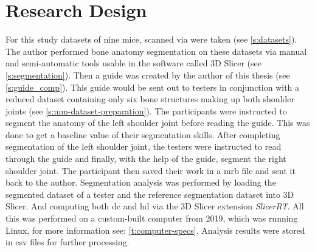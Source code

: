 \section{Research Design}\label{s:researchDesign}
For this study datasets of nine mice, scanned via \mct\space were taken (see \cref{s:datasets}).
The author performed bone anatomy segmentation on these datasets via manual and semi-automatic tools usable in the software called 3D Slicer (see \cref{s:segmentation}).
Then a guide was created by the author of this thesis (see \cref{s:guide_comp}).
This guide would be sent out to testers in conjunction with a reduced dataset containing only six bone structures making up both shoulder joints (see \cref{s:mm-dataset-preparation}).
The participants were instructed to segment the anatomy of the left shoulder joint before reading the guide.
This was done to get a baseline value of their segmentation skills.
After completing segmentation of the left shoulder joint, the testers were instructed to read through the guide and finally,
with the help of the guide, segment the right shoulder joint.
The participant then saved their work in a \acrfull{mrb} file and sent it back to the author.
Segmentation analysis was performed by loading the segmented dataset of a tester and the reference segmentation dataset into 3D Slicer.
And computing both \acrlong{dc} and \acrlong{hd} via the 3D Slicer extension \textit{SlicerRT}.
All this was performed on a custom-built computer from 2019,
which was running Linux, for more information see: \cref{t:computer-specs}.
Analysis results were stored in \acrfull{csv} files for further processing.


